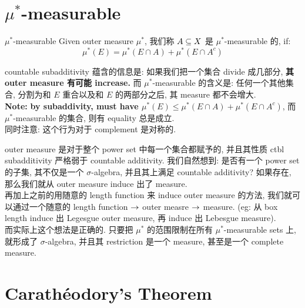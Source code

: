 \documentclass[lang=cn,11pt]{elegantbook}
\begin{document}
\section{$\mu^*$-measurable}
\begin{definition}{$\mu^*$-measurable}
    Given outer measure $\mu^*$, 我们称 $A \subseteq X$ 是 $\mu^*$-measurable 的, if:
    $$
    \mu^*(E) = \mu^*(E \cap A) + \mu^*(E \cap A^c)
    $$
\end{definition}
\begin{remark}
countable subadditivity 蕴含的信息是: 如果我们把一个集合 divide 成几部分, \textbf{其 outer measure 有可能 increase.}  而 $\mu^*$-measurable 的含义是: 任何一个其他集合, 分割为和 $E$ 重合以及和 $E$ 的两部分之后, 其 measure 都不会增大.\\
\noindent \textbf{Note: }\textbf{by subaddivity, must have $\mu^*(E) \leq \mu^*(E\cap A) + \mu^*(E\cap A^c)$}, 而 $\mu^*$-measurable 的集合, 则有 equality 总是成立.\\
\noindent 同时注意: 这个行为对于 complement 是对称的.
\end{remark}

\begin{remark}
 outer measure 是对于整个 power set 中每一个集合都赋予的, 并且其性质 ctbl subadditivity 严格弱于 countable additivity. 
 我们自然想到: 是否有一个 power set 的子集, 其不仅是一个 $\sigma$-algebra, 并且其上满足 countable additivity? 如果存在, 那么我们就从 outer measure induce 出了 measure. 
 \\ \noindent 再加上之前的用随意的 length function 来 induce outer measure 的方法, 我们就可以通过一个随意的 length function $\rightarrow $ outer measre $\rightarrow$ measure. (eg: 从 box length induce 出 Legesgue outer measure, 再 induce 出 Lebesgue measure).\\
 \noindent 而实际上这个想法是正确的. 只要把 $\mu^*$ 的范围限制在所有 $\mu^*$-measurable sets 上, 就形成了 $\sigma$-algebra, 并且其 restriction 是一个 measure,  甚至是一个 complete measure.
\end{remark}

\section{Carathéodory's Theorem}
\end{document}
